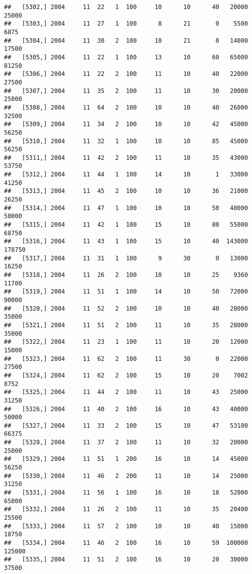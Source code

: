 \documentclass{article}\usepackage[]{graphicx}\usepackage[]{color}
\makeatletter
\newenvironment{kframe}{%
 \def\at@end@of@kframe{}%
 \ifinner\ifhmode%
  \def\at@end@of@kframe{\end{minipage}}%
  \begin{minipage}{\columnwidth}%
 \fi\fi%
 \def\FrameCommand##1{\hskip\@totalleftmargin \hskip-\fboxsep
 \colorbox{shadecolor}{##1}\hskip-\fboxsep
     \hskip-\linewidth \hskip-\@totalleftmargin \hskip\columnwidth}%
 \MakeFramed {\advance\hsize-\width
   \@totalleftmargin\z@ \linewidth\hsize
   \@setminipage}}%
 {\par\unskip\endMakeFramed%
 \at@end@of@kframe}
\newenvironment{knitrout}{}{} %
\makeatother
\begin{document}
\begin{knitrout}
\begin{kframe}
\begin{verbatim}
##   [5302,] 2004     11  22   1  100     10      10      40   20000   25000
##   [5303,] 2004     11  27   1  100      8      21       0    5500    6875
##   [5304,] 2004     11  30   2  100     10      21       0   14000   17500
##   [5305,] 2004     11  22   1  100     13      10      60   65000   81250
##   [5306,] 2004     11  22   2  100     11      10      40   22000   27500
##   [5307,] 2004     11  35   2  100     11      10      30   20000   25000
##   [5308,] 2004     11  64   2  100     10      10      40   26000   32500
##   [5309,] 2004     11  34   2  100     10      10      42   45000   56250
##   [5310,] 2004     11  32   1  100     10      10      85   45000   56250
##   [5311,] 2004     11  42   2  100     11      10      35   43000   53750
##   [5312,] 2004     11  44   1  100     14      10       1   33000   41250
##   [5313,] 2004     11  45   2  100     10      10      36   21000   26250
##   [5314,] 2004     11  47   1  100     10      10      50   40000   50000
##   [5315,] 2004     11  42   1  100     15      10      80   55000   68750
##   [5316,] 2004     11  43   1  100     15      10      40  143000  178750
##   [5317,] 2004     11  31   1  100      9      30       0   13000   16250
##   [5318,] 2004     11  26   2  100     10      10      25    9360   11700
##   [5319,] 2004     11  51   1  100     14      10      50   72000   90000
##   [5320,] 2004     11  52   2  100     10      10      40   28000   35000
##   [5321,] 2004     11  51   2  100     11      10      35   28000   35000
##   [5322,] 2004     11  23   1  100     11      10      20   12000   15000
##   [5323,] 2004     11  62   2  100     11      30       0   22000   27500
##   [5324,] 2004     11  62   2  100     15      10      20    7002    8752
##   [5325,] 2004     11  44   2  100     11      10      43   25000   31250
##   [5326,] 2004     11  40   2  100     16      10      43   40000   50000
##   [5327,] 2004     11  33   2  100     15      10      47   53100   66375
##   [5328,] 2004     11  37   2  100     11      10      32   20000   25000
##   [5329,] 2004     11  51   1  200     16      10      14   45000   56250
##   [5330,] 2004     11  46   2  200     11      10      14   25000   31250
##   [5331,] 2004     11  56   1  100     16      10      18   52000   65000
##   [5332,] 2004     11  26   2  100     11      10      35   20400   25500
##   [5333,] 2004     11  57   2  100     10      10      40   15000   18750
##   [5334,] 2004     11  46   2  100     16      10      59  100000  125000
##   [5335,] 2004     11  51   2  100     16      10      20   30000   37500

\end{verbatim}
\end{kframe}
\end{knitrout}
\end{document}

